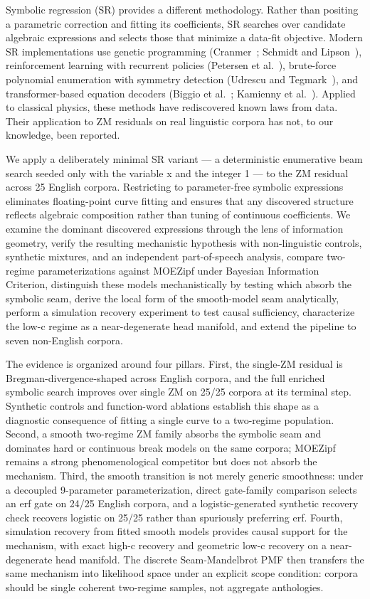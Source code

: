 \documentclass[11pt]{article}
\begin{document}
Symbolic regression (SR) provides a different methodology. Rather than positing a parametric correction and fitting its coefficients, SR searches over candidate algebraic expressions and selects those that minimize a data-fit objective. Modern SR implementations use genetic programming (Cranmer~\cite{cranmer2023}; Schmidt and Lipson~\cite{schmidt2009}), reinforcement learning with recurrent policies (Petersen et al.~\cite{petersen2020}), brute-force polynomial enumeration with symmetry detection (Udrescu and Tegmark~\cite{udrescu2020}), and transformer-based equation decoders (Biggio et al.~\cite{biggio2021}; Kamienny et al.~\cite{kamienny2022}). Applied to classical physics, these methods have rediscovered known laws from data. Their application to ZM residuals on real linguistic corpora has not, to our knowledge, been reported.

We apply a deliberately minimal SR variant — a deterministic enumerative beam search seeded only with the variable x and the integer 1 — to the ZM residual across 25 English corpora. Restricting to parameter-free symbolic expressions eliminates floating-point curve fitting and ensures that any discovered structure reflects algebraic composition rather than tuning of continuous coefficients. We examine the dominant discovered expressions through the lens of information geometry, verify the resulting mechanistic hypothesis with non-linguistic controls, synthetic mixtures, and an independent part-of-speech analysis, compare two-regime parameterizations against MOEZipf under Bayesian Information Criterion, distinguish these models mechanistically by testing which absorb the symbolic seam, derive the local form of the smooth-model seam analytically, perform a simulation recovery experiment to test causal sufficiency, characterize the low-c regime as a near-degenerate head manifold, and extend the pipeline to seven non-English corpora.

The evidence is organized around four pillars. First, the single-ZM residual is Bregman-divergence-shaped across English corpora, and the full enriched symbolic search improves over single ZM on 25/25 corpora at its terminal step. Synthetic controls and function-word ablations establish this shape as a diagnostic consequence of fitting a single curve to a two-regime population. Second, a smooth two-regime ZM family absorbs the symbolic seam and dominates hard or continuous break models on the same corpora; MOEZipf remains a strong phenomenological competitor but does not absorb the mechanism. Third, the smooth transition is not merely generic smoothness: under a decoupled 9-parameter parameterization, direct gate-family comparison selects an erf gate on 24/25 English corpora, and a logistic-generated synthetic recovery check recovers logistic on 25/25 rather than spuriously preferring erf. Fourth, simulation recovery from fitted smooth models provides causal support for the mechanism, with exact high-c recovery and geometric low-c recovery on a near-degenerate head manifold. The discrete Seam-Mandelbrot PMF then transfers the same mechanism into likelihood space under an explicit scope condition: corpora should be single coherent two-regime samples, not aggregate anthologies.
\end{document}
